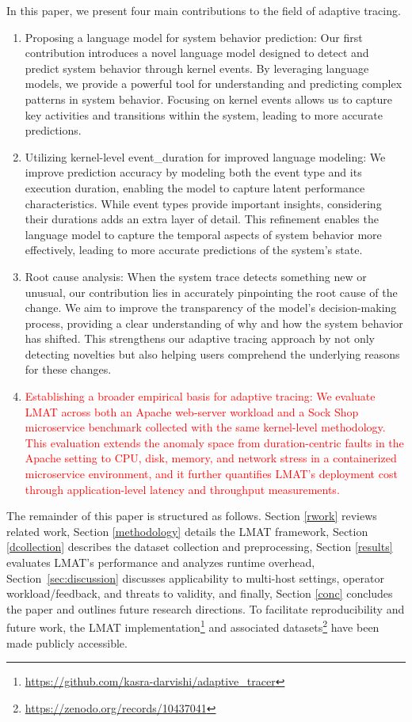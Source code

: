 \documentclass[preprint,12pt]{elsarticle}
\begin{document}
In this paper, we present four main contributions to the field of adaptive tracing.
\begin{enumerate}
    \item Proposing a language model for system behavior prediction: Our first contribution introduces a novel language model designed to detect and predict system behavior through kernel events. By leveraging language models, we provide a powerful tool for understanding and predicting complex patterns in system behavior. Focusing on kernel events allows us to capture key activities and transitions within the system, leading to more accurate predictions.
    \item Utilizing kernel-level {event\_duration} for improved language modeling: We improve prediction accuracy by modeling both the event type and its execution duration, enabling the model to capture latent performance characteristics. While event types provide important insights, considering their durations adds an extra layer of detail. This refinement enables the language model to capture the temporal aspects of system behavior more effectively, leading to more accurate predictions of the system's state.
    \item Root cause analysis: When the system trace detects something new or unusual, our contribution lies in accurately pinpointing the root cause of the change. We aim to improve the transparency of the model's decision-making process, providing a clear understanding of why and how the system behavior has shifted. This strengthens our adaptive tracing approach by not only detecting novelties but also helping users comprehend the underlying reasons for these changes.
    \item \textcolor{red}{Establishing a broader empirical basis for adaptive tracing: We evaluate LMAT across both an Apache web-server workload and a Sock Shop microservice benchmark collected with the same kernel-level methodology. This evaluation extends the anomaly space from duration-centric faults in the Apache setting to CPU, disk, memory, and network stress in a containerized microservice environment, and it further quantifies LMAT's deployment cost through application-level latency and throughput measurements.}
\end{enumerate}


The remainder of this paper is structured as follows. Section \ref{rwork} reviews related work, Section \ref{methodology} details the LMAT framework, Section \ref{dcollection} describes the dataset collection and preprocessing, Section \ref{results} evaluates LMAT’s performance and analyzes runtime overhead, Section~\ref{sec:discussion} discusses applicability to multi-host settings, operator workload/feedback, and threats to validity, and finally, Section \ref{conc} concludes the paper and outlines future research directions. To facilitate reproducibility and future work, the LMAT implementation\footnote{\url{https://github.com/kasra-darvishi/adaptive_tracer}} and associated datasets\footnote{\url{https://zenodo.org/records/10437041}} have been made publicly accessible.
\end{document}
